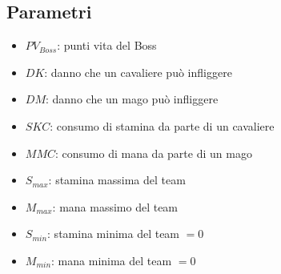 \documentclass[12pt]{article}
\begin{document}
    \subsection{Parametri}
    \begin{itemize}
        \item $PV_{Boss}$: punti vita del Boss
        \item $DK$: danno che un cavaliere può infliggere
        \item $DM$: danno che un mago può infliggere
        \item $SKC$: consumo di stamina da parte di un cavaliere
        \item $MMC$: consumo di mana da parte di un mago
        \item $S_{max}$: stamina massima del team
        \item $M_{max}$: mana massimo del team
        \item $S_{min}$: stamina minima del team $=0$
        \item $M_{min}$: mana minima del team $=0$
    \end{itemize}
\end{document}
